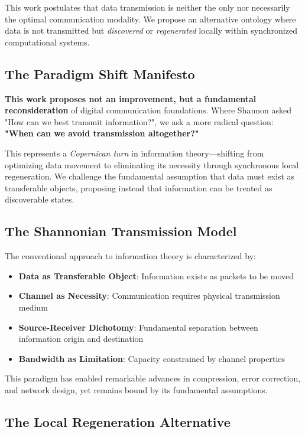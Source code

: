 \documentclass[11pt,a4paper]{article}
\begin{document}
This work postulates that data transmission is neither the only nor necessarily the optimal communication modality. We propose an alternative ontology where data is not transmitted but \emph{discovered} or \emph{regenerated} locally within synchronized computational systems.

\subsection{The Paradigm Shift Manifesto}

\textbf{This work proposes not an improvement, but a fundamental reconsideration} of digital communication foundations. Where Shannon asked "How can we best transmit information?", we ask a more radical question: \textbf{"When can we avoid transmission altogether?"}

This represents a \emph{Copernican turn} in information theory—shifting from optimizing data movement to eliminating its necessity through synchronous local regeneration. We challenge the fundamental assumption that data must exist as transferable objects, proposing instead that information can be treated as discoverable states.

\subsection{The Shannonian Transmission Model}

The conventional approach to information theory is characterized by:

\begin{itemize}
    \item \textbf{Data as Transferable Object}: Information exists as packets to be moved
    \item \textbf{Channel as Necessity}: Communication requires physical transmission medium
    \item \textbf{Source-Receiver Dichotomy}: Fundamental separation between information origin and destination
    \item \textbf{Bandwidth as Limitation}: Capacity constrained by channel properties
\end{itemize}

This paradigm has enabled remarkable advances in compression, error correction, and network design, yet remains bound by its fundamental assumptions.

\subsection{The Local Regeneration Alternative}
\end{document}
